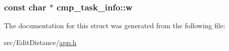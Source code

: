 \hypertarget{structcmp__task__info_a4539e63c72404966130c3129cd71aa8d}{
\subsubsection[{w}]{\setlength{\rightskip}{0pt plus 5cm}const char $\ast$ cmp\+\_\+task\+\_\+info\+::w}}\label{structcmp__task__info_a4539e63c72404966130c3129cd71aa8d}


The documentation for this struct was generated from the following file\+:\begin{DoxyCompactItemize}
\item 
src/\+Edit\+Distance/\hyperlink{_edit_distance_2app_8h}{app.\+h}\end{DoxyCompactItemize}
